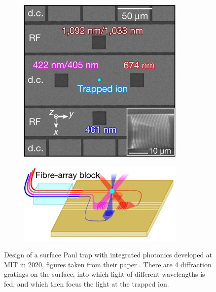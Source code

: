 \begin{figure}[H]
    \centering
    \begin{subfigure}[b]{0.45\textwidth}
        \centering
        \includegraphics[width=0.9\textwidth]{images/TIQC_MIT_1.jpg}
    \end{subfigure}
    \hfill
    \begin{subfigure}[b]{0.45\textwidth}
        \centering
        \includegraphics[width=0.9\textwidth]{images/TIQC_MIT_2.jpg}
    \end{subfigure}
    \caption{Design of a surface Paul trap with integrated photonics developed at MIT in 2020, figures taken from their paper \cite{niffeneggerIntegratedMultiwavelengthControl2020}.
    There are 4 diffraction gratings on the surface, into which light of different wavelengths is fed, and which then focus the light at the trapped ion.}\label{fig:TIQC_MIT}
\end{figure}

